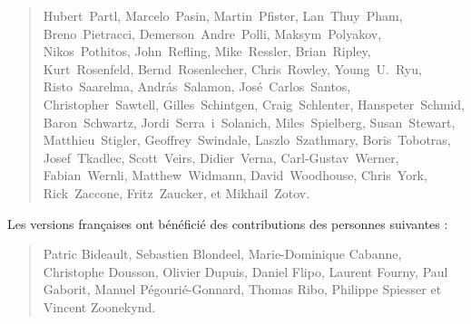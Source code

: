 \begin{quote}
Hubert~Partl,           %
Marcelo~Pasin,          %
Martin~Pfister,		%
Lan~Thuy~Pham,          %
Breno~Pietracci,        %
Demerson~Andre~Polli,   %
Maksym~Polyakov,        %
Nikos~Pothitos,		%
John~Refling,           %
Mike~Ressler,           %
Brian~Ripley,           %
Kurt~Rosenfeld,		%
Bernd~Rosenlecher,      %
Chris~Rowley,           %
Young~U.~Ryu,           %
Risto~Saarelma,         %
Andr{\'a}s~Salamon,     %
Jos\'e~Carlos~Santos,   %
Christopher~Sawtell,    %
Gilles~Schintgen,       %
Craig~Schlenter,        %
Hanspeter~Schmid,       %
Baron~Schwartz,         %
Jordi~Serra~i~Solanich, %
Miles~Spielberg,        %
Susan~Stewart,
Matthieu~Stigler,
Geoffrey~Swindale,      %
Laszlo~Szathmary,       %
Boris~Tobotras,         %
Josef~Tkadlec,          %
Scott~Veirs,            %
Didier~Verna,           %
Carl-Gustav~Werner,     %
Fabian~Wernli,          %
Matthew~Widmann,        %
David~Woodhouse,        %
Chris~York,             %
Rick~Zaccone,           %
Fritz~Zaucker,          %
et Mikhail~Zotov.      %
\end{quote}

\newpage
Les versions françaises ont bénéficié des contributions des personnes
suivantes :
\begin{quote}
\flushleft
 Patric Bideault,               %
 Sebastien Blondeel,            %
 Marie-Dominique Cabanne,       %
 Christophe Dousson,            %
 Olivier Dupuis,		%
 Daniel Flipo,                  %
 Laurent Fourny,                %
 Paul Gaborit,                  %
 Manuel Pégourié-Gonnard,       %
 Thomas Ribo,			%
 Philippe Spiesser              %
et Vincent Zoonekynd.           %
\end{quote}

